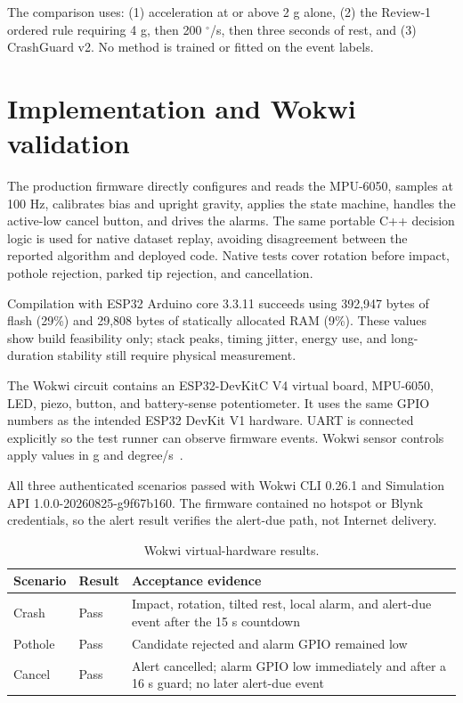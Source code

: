 \documentclass[12pt,a4paper]{article}
\newcommand{\degree}{\ensuremath{^{\circ}}}
\begin{document}
The comparison uses: (1) acceleration at or above 2 g alone, (2) the Review-1
ordered rule requiring 4 g, then 200 $\degree$/s, then three seconds of rest,
and (3) CrashGuard v2. No method is trained or fitted on the event labels.

\section{Implementation and Wokwi validation}

The production firmware directly configures and reads the MPU-6050, samples
at 100 Hz, calibrates bias and upright gravity, applies the state machine,
handles the active-low cancel button, and drives the alarms. The same portable
C++ decision logic is used for native dataset replay, avoiding disagreement
between the reported algorithm and deployed code. Native tests cover rotation
before impact, pothole rejection, parked tip rejection, and cancellation.

Compilation with ESP32 Arduino core 3.3.11 succeeds using 392,947 bytes of
flash (29\%) and 29,808 bytes of statically allocated RAM (9\%). These values
show build feasibility only; stack peaks, timing jitter, energy use, and
long-duration stability still require physical measurement.

The Wokwi circuit contains an ESP32-DevKitC V4 virtual board, MPU-6050, LED,
piezo, button, and battery-sense potentiometer. It uses the same GPIO numbers
as the intended ESP32 DevKit V1 hardware. UART is connected explicitly so the
test runner can observe firmware events. Wokwi sensor controls apply values in
g and degree/s~\cite{wokwidiagram,wokwimpu,wokwiscenarios}.

All three authenticated scenarios passed with Wokwi CLI 0.26.1 and Simulation
API 1.0.0-20260825-g9f67b160. The firmware contained no hotspot or Blynk
credentials, so the alert result verifies the alert-due path, not Internet
delivery.

\begin{table}[H]
\centering
\small
\caption{Wokwi virtual-hardware results.}
\begin{tabularx}{\textwidth}{@{}p{}p{}X@{}}
\toprule
Scenario & Result & Acceptance evidence \\
\midrule
Crash & Pass & Impact, rotation, tilted rest, local alarm, and alert-due event
after the 15 s countdown \\
Pothole & Pass & Candidate rejected and alarm GPIO remained low \\
Cancel & Pass & Alert cancelled; alarm GPIO low immediately and after a 16 s
guard; no later alert-due event \\
\bottomrule
\end{tabularx}
\end{table}
\end{document}
